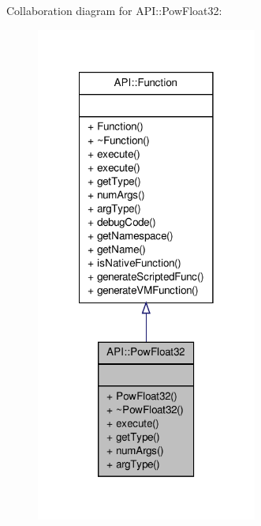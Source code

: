 Collaboration diagram for A\-P\-I\-:\-:Pow\-Float32\-:
\nopagebreak
\begin{figure}[H]
\begin{center}
\leavevmode
\includegraphics[width=206pt]{class_a_p_i_1_1_pow_float32__coll__graph}
\end{center}
\end{figure}
